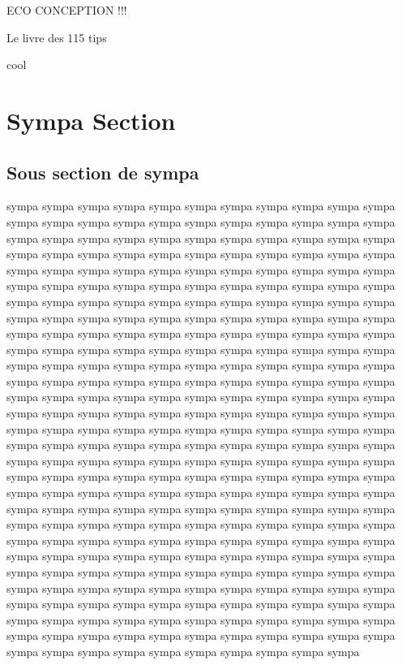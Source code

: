 ECO CONCEPTION !!!

Le livre des 115 tips \cite{ecoconception}
\newpage

cool

\newpage

\section{Sympa Section}

\subsection{Sous section de sympa}

sympa sympa sympa sympa sympa sympa sympa sympa sympa sympa sympa sympa sympa sympa sympa sympa sympa sympa sympa sympa sympa sympa sympa sympa sympa sympa sympa sympa sympa sympa sympa sympa sympa sympa sympa sympa sympa sympa sympa sympa sympa sympa sympa sympa sympa sympa sympa sympa sympa sympa sympa sympa sympa sympa sympa sympa sympa sympa sympa sympa sympa sympa sympa sympa sympa sympa sympa sympa sympa sympa sympa sympa sympa sympa sympa sympa sympa sympa sympa sympa sympa sympa sympa sympa sympa sympa sympa sympa sympa sympa sympa sympa sympa sympa sympa sympa sympa sympa sympa sympa sympa sympa sympa sympa sympa sympa sympa sympa sympa sympa sympa sympa sympa sympa sympa sympa sympa sympa sympa sympa sympa sympa sympa sympa sympa sympa sympa sympa sympa sympa sympa sympa sympa sympa sympa sympa sympa sympa sympa sympa sympa sympa sympa sympa sympa sympa sympa sympa sympa sympa sympa sympa sympa sympa sympa sympa sympa sympa sympa sympa sympa sympa sympa sympa sympa sympa sympa sympa sympa sympa sympa sympa sympa sympa sympa sympa sympa sympa sympa sympa sympa sympa sympa sympa sympa sympa sympa sympa sympa sympa sympa sympa sympa sympa sympa sympa sympa sympa sympa sympa sympa sympa sympa sympa sympa sympa sympa sympa sympa sympa sympa sympa sympa sympa sympa sympa sympa sympa sympa sympa sympa sympa sympa sympa sympa sympa sympa sympa sympa sympa sympa sympa sympa sympa sympa sympa sympa sympa sympa sympa sympa sympa sympa sympa sympa sympa sympa sympa sympa sympa sympa sympa sympa sympa sympa sympa sympa sympa sympa sympa sympa sympa sympa sympa sympa sympa sympa sympa sympa sympa sympa sympa sympa sympa sympa sympa sympa sympa sympa sympa sympa sympa sympa sympa sympa sympa sympa sympa sympa sympa sympa sympa sympa sympa sympa sympa sympa sympa sympa sympa sympa sympa sympa sympa sympa sympa sympa sympa sympa sympa sympa sympa sympa sympa sympa sympa sympa sympa
